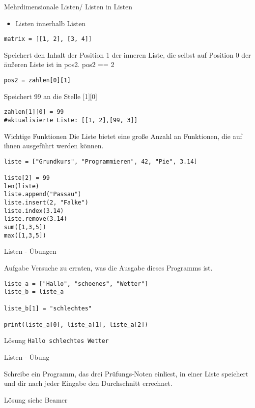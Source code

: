 \begin{frame}[fragile]{Mehrdimensionale Listen/ Listen in Listen}
\begin{itemize}
	\item Listen innerhalb Listen	
\end{itemize}
\begin{lstlisting}
matrix = [[1, 2], [3, 4]]
\end{lstlisting}
Speichert den Inhalt der Position 1 der inneren Liste, die selbst auf Position 0 der {\"a}u{\ss}eren Liste ist in pos2. pos2 == 2
\begin{lstlisting}
pos2 = zahlen[0][1]
\end{lstlisting}
Speichert 99 an die Stelle [1][0]
\begin{lstlisting}
zahlen[1][0] = 99
#aktualisierte Liste: [[1, 2],[99, 3]]
\end{lstlisting}
\end{frame}


%
\begin{frame}[fragile]{Wichtige Funktionen}
Die Liste bietet eine große Anzahl an  Funktionen, die auf ihnen
ausgeführt werden können.

\begin{lstlisting}
liste = ["Grundkurs", "Programmieren", 42, "Pie", 3.14]

liste[2] = 99
len(liste)
liste.append("Passau")
liste.insert(2, "Falke")
liste.index(3.14)
liste.remove(3.14)
sum([1,3,5])
max([1,3,5])
\end{lstlisting}
\end{frame}


\begin{frame}[fragile]{Listen - Übungen}
\begin{block}{Aufgabe}
Versuche zu erraten, was die Ausgabe dieses Programms ist.
\end{block}

\begin{lstlisting}
liste_a = ["Hallo", "schoenes", "Wetter"]
liste_b = liste_a

liste_b[1] = "schlechtes"

print(liste_a[0], liste_a[1], liste_a[2])  
\end{lstlisting}
\pause{}
\begin{exampleblock}{Lösung}
    \texttt{Hallo schlechtes Wetter}
\end{exampleblock}
\end{frame}

\begin{frame}[fragile]{Listen - Übung}

Schreibe ein Programm, das drei Prüfungs-Noten einliest, in einer
Liste speichert und dir nach jeder Eingabe den Durchschnitt errechnet. 
\pause{}
\begin{exampleblock}{Lösung}
siehe Beamer
\end{exampleblock}
\end{frame}

